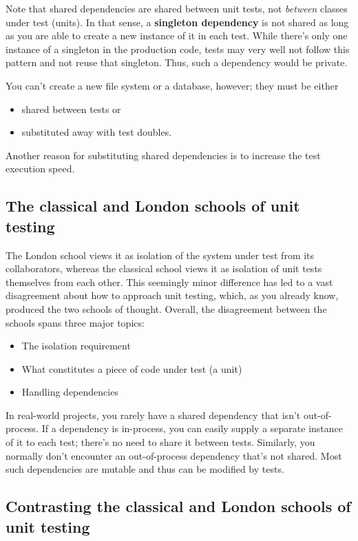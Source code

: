 \documentclass{article}
\begin{document}
Note that shared dependencies are shared between unit tests, not \textit{between} classes under test (units). In that sense, a \textbf{singleton dependency} is not shared as long as you are able to create a new instance of it in each test. While there’s only one instance of a singleton in the production code, tests may very well not follow this pattern and not reuse that singleton. Thus, such a dependency would be private.

You can't create a new file system or a database, however; they must be either
\begin{itemize}
	\item shared between tests or
	\item substituted away with test doubles.
\end{itemize}

Another reason for substituting shared dependencies is to increase the test execution speed.

\subsection{The classical and London schools of unit testing}

 The London school views it as isolation of the system under test from its collaborators, whereas the classical school views it as isolation of unit tests themselves from each other.  This seemingly minor difference has led to a vast disagreement about how to approach unit testing, which, as you already know, produced the two schools of thought. Overall, the disagreement between the schools spans three major topics:
\begin{itemize}
	\item The isolation requirement
	\item What constitutes a piece of code under test (a unit)
	\item Handling dependencies
\end{itemize}

 In real-world projects, you rarely have a shared dependency that isn't out-of-process. If a dependency is in-process, you can easily supply a separate instance of it to each test; there’s no need to share it between tests. Similarly, you normally don't encounter an out-of-process dependency that’s not shared. Most such dependencies are mutable and thus can be
modified by tests.

\subsection{ Contrasting the classical and London schools of unit testing}
\end{document}
